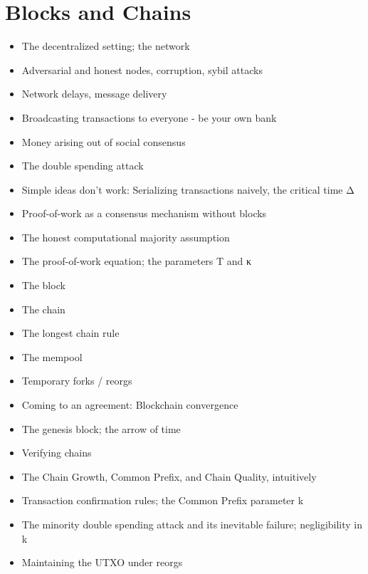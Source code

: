 \chapter{Blocks and Chains}

{\color{red}
\begin{itemize}
\item The decentralized setting; the network
\item Adversarial and honest nodes, corruption, sybil attacks
\item Network delays, message delivery
\item Broadcasting transactions to everyone - be your own bank
\item Money arising out of social consensus
\item The double spending attack
\item Simple ideas don't work: Serializing transactions naively, the critical time Δ
\item Proof-of-work as a consensus mechanism without blocks
\item The honest computational majority assumption
\item The proof-of-work equation; the parameters T and κ
\item The block
\item The chain
\item The longest chain rule
\item The mempool
\item Temporary forks / reorgs
\item Coming to an agreement: Blockchain convergence
\item The genesis block; the arrow of time
\item Verifying chains
\item The Chain Growth, Common Prefix, and Chain Quality, intuitively
\item Transaction confirmation rules; the Common Prefix parameter k
\item The minority double spending attack and its inevitable failure; negligibility in k
\item Maintaining the UTXO under reorgs
\end{itemize}
}
